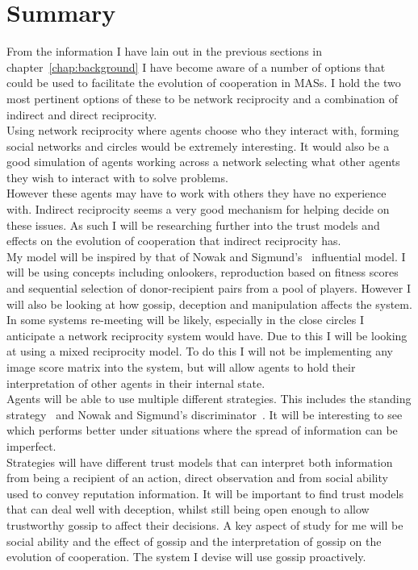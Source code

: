 \documentclass[]{final_report}
\begin{document}
\section{Summary}
From the information I have lain out in the previous sections in chapter~\ref{chap:background} I have become aware of a number of options that could be used to facilitate the evolution of cooperation in MASs. I hold the two most pertinent options of these to be network reciprocity and a combination of indirect and direct reciprocity.\\
Using network reciprocity where agents choose who they interact with, forming social networks and circles would be extremely interesting. It would also be a good simulation of agents working across a network selecting what other agents they wish to interact with to solve problems.\\
However these agents may have to work with others they have no experience with. Indirect reciprocity seems a very good mechanism for helping decide on these issues. As such I will be researching further into the trust models and effects on the evolution of cooperation that indirect reciprocity has.\\
My model will be inspired by that of Nowak and Sigmund's~\cite{evol_indirect_image} influential model. I will be using concepts including onlookers, reproduction based on fitness scores and sequential selection of donor-recipient pairs from a pool of players. However I will also be looking at how gossip, deception and manipulation affects the system.\\
In some systems re-meeting will be likely, especially in the close circles I anticipate a network reciprocity system would have. Due to this I will be looking at using a mixed reciprocity model. To do this I will not be implementing any image score matrix into the system, but will allow agents to hold their interpretation of other agents in their internal state.\\
Agents will be able to use multiple different strategies. This includes the standing strategy~\cite{sugden2004economics} and Nowak and Sigmund's discriminator~\cite{evol_indirect_image}. It will be interesting to see which performs better under situations where the spread of information can be imperfect.\\
Strategies will have different trust models that can interpret both information from being a recipient of an action, direct observation and from social ability used to convey reputation information. It will be important to find trust models that can deal well with deception, whilst still being open enough to allow trustworthy gossip to affect their decisions. A key aspect of study for me will be social ability and the effect of gossip and the interpretation of gossip on the evolution of cooperation. The system I devise will use gossip proactively.\\
\end{document}
